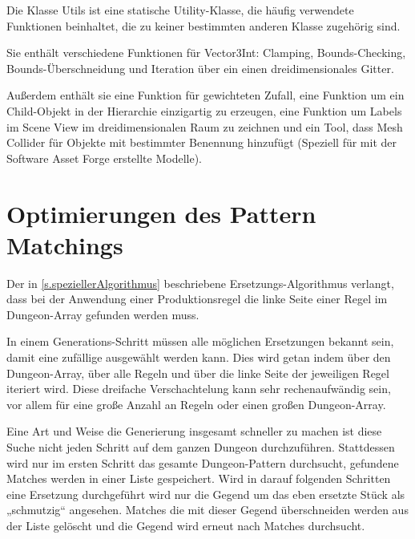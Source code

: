 Die Klasse Utils ist eine statische Utility-Klasse, die häufig verwendete Funktionen beinhaltet, die zu keiner bestimmten anderen Klasse zugehörig sind.

Sie enthält verschiedene Funktionen für Vector3Int\cite[Seite: Vector3Int]{unitySciptingReference}: Clamping, Bounds-Checking, Bounds-Überschneidung und Iteration über ein einen dreidimensionales Gitter.

Außerdem enthält sie eine Funktion für gewichteten Zufall, eine Funktion um ein Child-Objekt in der Hierarchie einzigartig zu erzeugen, eine Funktion um Labels im Scene View im dreidimensionalen Raum zu zeichnen und ein Tool, dass Mesh Collider für Objekte mit bestimmter Benennung hinzufügt (Speziell für mit der Software Asset Forge erstellte Modelle).

\section{Optimierungen des Pattern Matchings}\label{s.optimierungen}

Der in \ref{s.speziellerAlgorithmus} beschriebene Ersetzungs-Algorithmus verlangt, dass bei der Anwendung einer Produktionsregel die linke Seite einer Regel im Dungeon-Array gefunden werden muss.

In einem Generations-Schritt müssen alle möglichen Ersetzungen bekannt sein, damit eine zufällige ausgewählt werden kann. Dies wird getan indem über den Dungeon-Array, über alle Regeln und über die linke Seite der jeweiligen Regel iteriert wird. Diese dreifache Verschachtelung kann sehr rechenaufwändig sein, vor allem für eine große Anzahl an Regeln oder einen großen Dungeon-Array. 






Eine Art und Weise die Generierung insgesamt schneller zu machen ist diese Suche nicht jeden Schritt auf dem ganzen Dungeon durchzuführen. Stattdessen wird nur im ersten Schritt das gesamte Dungeon-Pattern durchsucht, gefundene Matches werden in einer Liste gespeichert. Wird in darauf folgenden Schritten eine Ersetzung durchgeführt wird nur die Gegend um das eben ersetzte Stück als „schmutzig“ angesehen. Matches die mit dieser Gegend überschneiden werden aus der Liste gelöscht und die Gegend wird erneut nach Matches durchsucht. 

